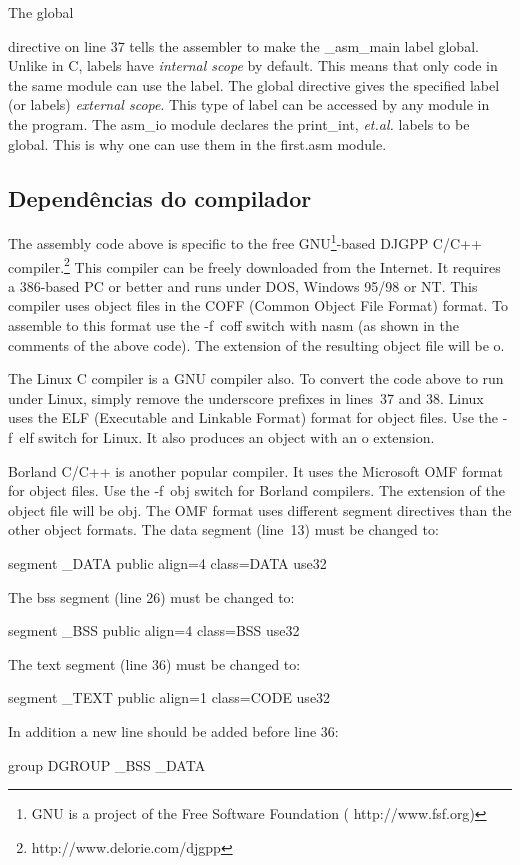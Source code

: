 The {\code global} { directive on line 37
tells the assembler to make the {\code \_asm\_main} label
global. Unlike in C, labels have \emph{internal scope} by
default. This means that only code in the same module can use the
label. The {\code global} directive gives the specified label (or
labels) \emph{external scope}. This type of label can be accessed by
any module in the program. The {\code asm\_io} module declares the
{\code print\_int}, {\em et.al.\/} labels to be global. This is why
one can use them in the {\code first.asm} module.

\subsection{Dependências do compilador}

The assembly code above is specific to the free GNU\footnote{GNU is a
project of the Free Software Foundation ({\code
http://www.fsf.org})}-based DJGPP  C/C++
compiler.\footnote{\code http://www.delorie.com/djgpp} This compiler
can be freely downloaded from the Internet. It requires a 386-based PC
or better and runs under DOS, Windows 95/98 or NT. This compiler uses
object files in the COFF (Common Object File Format) format. To
assemble to this format use the {\code -f~coff} switch with {\code
nasm} (as shown in the comments of the above code). The extension of
the resulting object file will be {\code o}.

The Linux C compiler is a GNU compiler also.  To
convert the code above to run under Linux, simply remove the
underscore prefixes in lines~37 and 38. Linux uses the ELF (Executable
and Linkable Format) format for object files. Use the {\code -f~elf}
switch for Linux. It also produces an object with an {\code o}
extension.

Borland C/C++  is another popular compiler. It
uses the Microsoft OMF format for object files. Use the {\code -f~obj}
switch for Borland compilers. The extension of the object file will be
{\code obj}. The OMF format uses different {\code segment} directives
than the other object formats. The data segment (line~13) must be
changed to:
\begin{CodeQuote}
segment \_DATA public align=4 class=DATA use32
\end{CodeQuote}
The bss segment (line 26) must be changed to:
\begin{CodeQuote}
segment \_BSS public align=4 class=BSS use32
\end{CodeQuote}
The text segment (line 36) must be changed to:
\begin{CodeQuote}
segment \_TEXT public align=1 class=CODE use32
\end{CodeQuote}
In addition a new line should be added before line 36:
\begin{CodeQuote}
group DGROUP \_BSS \_DATA
\end{CodeQuote}

}
